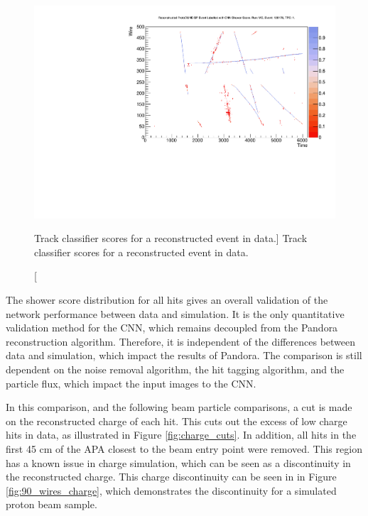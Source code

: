 \begin{figure}
	\centering
	\includegraphics[width=\textwidth]{figures/5387_image_tpc1_view2_128178.pdf}
	\caption
	[Track classifier scores for a reconstructed event in \protodune{} data.]
	{Track classifier scores for a reconstructed event in \protodune{} data.}
	\label{fig:real_event}
\end{figure}

The shower score distribution for all hits gives an overall validation of the 
network performance between data and simulation. It is the only quantitative 
validation method for the CNN, which remains decoupled from the Pandora 
reconstruction algorithm. Therefore, it is independent of the differences 
between data and simulation, which impact the results of Pandora.  The 
comparison is still dependent on the noise removal algorithm, the hit tagging 
algorithm, and the particle flux, which impact the input images to the CNN.

In this comparison, and the following beam particle comparisons, a cut is made 
on the reconstructed charge of each hit. This cuts out the excess of low 
charge hits in data, as illustrated in Figure \ref{fig:charge_cuts}.  In 
addition, all hits in the first 45 cm of the APA closest to the beam entry 
point were removed. This region has a known issue in charge simulation, which 
can be seen as a discontinuity in the reconstructed charge. This charge 
discontinuity can be seen in in Figure \ref{fig:90_wires_charge}, which 
demonstrates the discontinuity for a simulated proton beam sample.  

